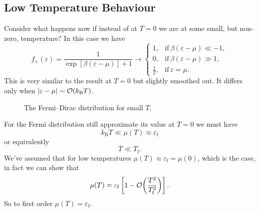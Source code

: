 \documentclass[a4paper]{article}
\newcommand{\boltzmann}{k_\mathrm{B}}
\newcommand{\fermiEnergy}{\varepsilon_{\mathrm{f}}}
\newcommand{\fermiTemp}{T_{\mathrm{f}}}
\begin{document}
    \subsection{Low Temperature Behaviour}
    Consider what happens now if instead of at \(T = 0\) we are at some small, but non-zero, temperature?
    In this case we have
    \[
        f_{+}(\varepsilon) = \frac{1}{\exp[\beta(\varepsilon - \mu)] + 1} \to 
        \begin{cases}
            1, & \text{if}~\beta(\varepsilon - \mu) \ll -1,\\
            0, & \text{if}~\beta(\varepsilon - \mu) \gg 1,\\
            \frac{1}{2}, & \text{if}~ \varepsilon = \mu.
        \end{cases}
    \]
    This is very similar to the result at \(T = 0\) but slightly smoothed out.
    It differs only when \(\abs{\varepsilon - \mu} \sim \order{\boltzmann T}\).
    \begin{figure}[ht]
        \centering
        \caption{The Fermi--Dirac distribution for small \(T\).}
        \label{fig:Fermi function at small T}
    \end{figure}
    For the Fermi distribution still approximate its value at \(T = 0\) we must have
    \[\boltzmann T \ll \mu(T) \approx \fermiEnergy\]
    or equivalently
    \[T \ll \fermiTemp.\]
    We've assumed that for low temperatures \(\mu(T) \approx \fermiEnergy = \mu(0)\), which is the case, in fact we can show that
    \[\mu(T) = \fermiEnergy\left[ 1 - \order{\frac{T^2}{\fermiTemp^2}} \right].\]
    So to first order \(\mu(T) = \fermiEnergy\).
    
\end{document}
